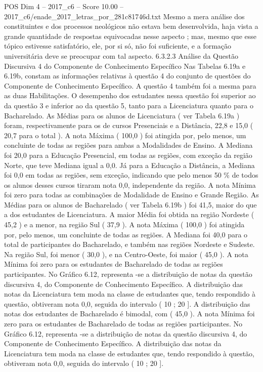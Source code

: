 \begin{textsample}{POS Dim 4 – 2017\_c6 – Score 10.00 – 2017\_c6/enade\_2017\_letras\_por\_281c81746d.txt}
Mesmo a mera análise dos constituintes e dos processos neológicos não estava bem desenvolvida, haja vista a grande quantidade de respostas equivocadas nesse aspecto ; mas, mesmo que esse tópico estivesse satisfatório, ele, por si só, não foi suficiente, e a formação universitária deve se preocupar com tal aspecto. 6.3.2.3 Análise da Questão Discursiva 4 do Componente de Conhecimento Específico Nas Tabelas 6.19a e 6.19b, constam as informações relativas à questão 4 do conjunto de questões do Componente de Conhecimento Específico.
A questão 4 também foi a mesma para as duas Habilitações.
O desempenho dos estudantes nessa questão foi superior ao da questão 3 e inferior ao da questão 5, tanto para a Licenciatura quanto para o Bacharelado.
As Médias para os alunos de Licenciatura ( ver Tabela 6.19a ) foram, respectivamente para os de cursos Presenciais e a Distância, 22,8 e 15,0 ( 20,7 para o total ).
A nota Máxima ( 100,0 ) foi atingida por, pelo menos, um concluinte de todas as regiões para ambas a Modalidades de Ensino.
A Mediana foi 20,0 para a Educação Presencial, em todas as regiões, com exceção da região Norte, que teve Mediana igual a 0,0.
Já para a Educação a Distância, a Mediana foi 0,0 em todas as regiões, sem exceção, indicando que pelo menos 50 \% de todos os alunos desses cursos tiraram nota 0,0, independente da região.
A nota Mínima foi zero para todas as combinações de Modalidade de Ensino e Grande Região.
As Médias para os alunos de Bacharelado ( ver Tabela 6.19b ) foi 41,5, maior do que a dos estudantes de Licenciatura.
A maior Média foi obtida na região Nordeste ( 45,2 ) e a menor, na região Sul ( 37,9 ).
A nota Máxima ( 100,0 ) foi atingida por, pelo menos, um concluinte de todas as regiões.
A Mediana foi 40,0 para o total de participantes do Bacharelado, e também nas regiões Nordeste e Sudeste.
Na região Sul, foi menor ( 30,0 ), e na Centro-Oeste, foi maior ( 45,0 ).
A nota Mínima foi zero para os estudantes de Bacharelado de todas as regiões participantes.
No Gráfico 6.12, representa -se a distribuição de notas da questão discursiva 4, do Componente de Conhecimento Específico.
A distribuição das notas da Licenciatura tem moda na classe de estudantes que, tendo respondido à questão, obtiveram nota 0,0, seguida do intervalo ( 10 ; 20 ].
A distribuição das notas dos estudantes de Bacharelado é bimodal, com ( 45,0 ).
A nota Mínima foi zero para os estudantes de Bacharelado de todas as regiões participantes.
No Gráfico 6.12, representa -se a distribuição de notas da questão discursiva 4, do Componente de Conhecimento Específico.
A distribuição das notas da Licenciatura tem moda na classe de estudantes que, tendo respondido à questão, obtiveram nota 0,0, seguida do intervalo ( 10 ; 20 ].

\end{textsample}
